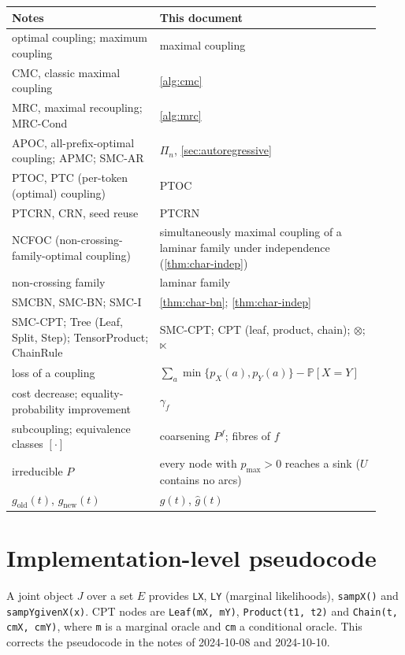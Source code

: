 \documentclass[11pt]{article}
\theoremstyle{definition}
\newcommand{\pX}{p_X}
\newcommand{\pY}{p_Y}
\newcommand{\pmax}{p_{\max}}
\renewcommand{\Pr}{\mathbb{P}}
\begin{document}
\begin{center}\small
\begin{tabular}{@{}p{0.38\linewidth}p{0.55\linewidth}@{}}
\toprule
Notes & This document\\
\midrule
optimal coupling; maximum coupling & maximal coupling\\
CMC, classic maximal coupling & \cref{alg:cmc}\\
MRC, maximal recoupling; MRC-Cond & \cref{alg:mrc}\\
APOC, all-prefix-optimal coupling; APMC; SMC-AR & $\Pi_n$, \cref{sec:autoregressive}\\
PTOC, PTC (per-token (optimal) coupling) & PTOC\\
PTCRN, CRN, seed reuse & PTCRN\\
NCFOC (non-crossing-family-optimal coupling) & simultaneously maximal coupling of a laminar family under independence (\cref{thm:char-indep})\\
non-crossing family & laminar family\\
SMCBN, SMC-BN; SMC-I & \cref{thm:char-bn}; \cref{thm:char-indep}\\
SMC-CPT; Tree (Leaf, Split, Step); TensorProduct; ChainRule & SMC-CPT; CPT (leaf, product, chain); $\otimes$; $\ltimes$\\
loss of a coupling & $\sum_a\min\{\pX(a),\pY(a)\}-\Pr[X=Y]$\\
cost decrease; equality-probability improvement & $\gamma_f$\\
subcoupling; equivalence classes $[\cdot]$ & coarsening $P^f$; fibres of $f$\\
irreducible $P$ & every node with $\pmax>0$ reaches a sink ($U$ contains no arcs)\\
$g_{\mathrm{old}}(t)$, $g_{\mathrm{new}}(t)$ & $g(t)$, $\hat g(t)$\\
\bottomrule
\end{tabular}
\end{center}

\section{Implementation-level pseudocode}\label{app:pseudocode}

A joint object $J$ over a set $E$ provides \texttt{LX}, \texttt{LY} (marginal
likelihoods), \texttt{sampX()} and \texttt{sampYgivenX(x)}. CPT nodes are
\texttt{Leaf(mX, mY)}, \texttt{Product(t1, t2)} and \texttt{Chain(t, cmX, cmY)},
where \texttt{m} is a marginal oracle and \texttt{cm} a conditional oracle. This
corrects the pseudocode in the notes of 2024-10-08 and 2024-10-10.
\end{document}

